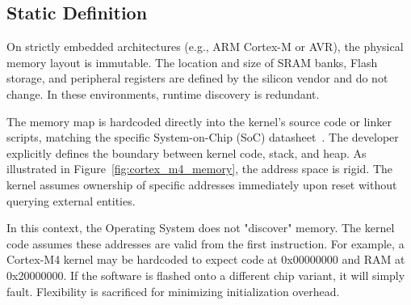 \documentclass[a4paper,10pt,twoside]{report}
\theoremstyle{definition}
\begin{document}
\subsection{Static Definition}

On strictly embedded architectures (e.g., ARM Cortex-M or AVR), the physical memory layout is immutable. The location and size of SRAM banks, Flash storage, and peripheral registers are defined by the silicon vendor and do not change. In these environments, runtime discovery is redundant.

The memory map is hardcoded directly into the kernel's source code or linker scripts, matching the specific System-on-Chip (SoC) datasheet~\cite{ARM-CortexM4-Generic-User-Guide}. The developer explicitly defines the boundary between kernel code, stack, and heap. As illustrated in Figure~\ref{fig:cortex_m4_memory}, the address space is rigid. The kernel assumes ownership of specific addresses immediately upon reset without querying external entities.

In this context, the Operating System does not "discover" memory. The kernel code assumes these addresses are valid from the first instruction. For example, a Cortex-M4 kernel may be hardcoded to expect code at 0x00000000 and RAM at 0x20000000. If the software is flashed onto a different chip variant, it will simply fault. Flexibility is sacrificed for minimizing initialization overhead.
\end{document}
